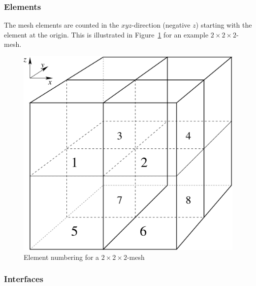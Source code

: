 \subsubsection{Elements}
\label{sec:elements}

The mesh elements are counted in the $xyz$-direction (negative $z$)
starting with the element at the origin. This is illustrated in
Figure~\ref{fig:cvnumber} for an example $2 \times 2 \times 2$-mesh. 
%
\begin{figure}[htbp]
  \centering
  \includegraphics[scale=0.3]{../figures/elementnum}
  \caption{Element numbering for a $2 \times 2 \times 2$-mesh}
  \label{fig:cvnumber}
\end{figure}
%

\subsubsection{Interfaces}
\label{sec:struct-interfaces}

